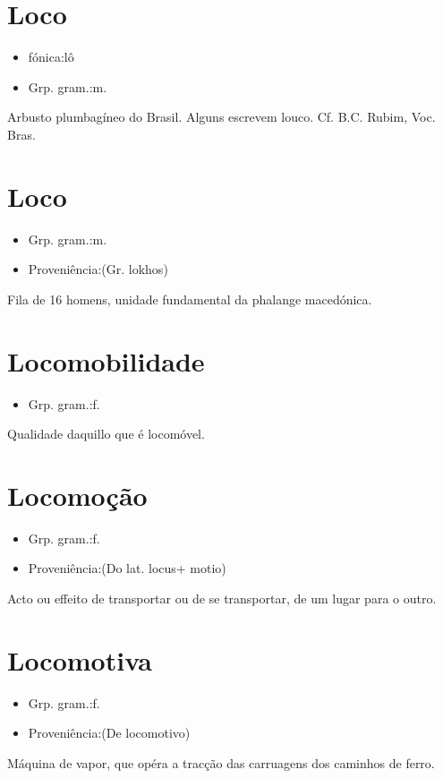 \section{Loco}
\begin{itemize}
\item {fónica:lô}
\end{itemize}
\begin{itemize}
\item {Grp. gram.:m.}
\end{itemize}
Arbusto plumbagíneo do Brasil.
Alguns escrevem \textunderscore louco\textunderscore . Cf. B.C. Rubim, \textunderscore Voc. Bras.\textunderscore 
\section{Loco}
\begin{itemize}
\item {Grp. gram.:m.}
\end{itemize}
\begin{itemize}
\item {Proveniência:(Gr. \textunderscore lokhos\textunderscore )}
\end{itemize}
Fila de 16 homens, unidade fundamental da phalange macedónica.
\section{Locomobilidade}
\begin{itemize}
\item {Grp. gram.:f.}
\end{itemize}
Qualidade daquillo que é locomóvel.
\section{Locomoção}
\begin{itemize}
\item {Grp. gram.:f.}
\end{itemize}
\begin{itemize}
\item {Proveniência:(Do lat. \textunderscore locus\textunderscore  + \textunderscore motio\textunderscore )}
\end{itemize}
Acto ou effeito de transportar ou de se transportar, de um lugar para o outro.
\section{Locomotiva}
\begin{itemize}
\item {Grp. gram.:f.}
\end{itemize}
\begin{itemize}
\item {Proveniência:(De \textunderscore locomotivo\textunderscore )}
\end{itemize}
Máquina de vapor, que opéra a tracção das carruagens dos caminhos de ferro.
